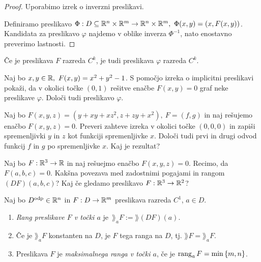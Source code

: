 \begin{proof}
    Uporabimo izrek o inverzni preslikavi. 
    
    Definiramo preslikavo $\Phi: D \subseteq \mathbb{R}^n \times \mathbb{R}^m \to  \mathbb{R}^n \times \mathbb{R}^m, \ \Phi(x,y) = (x, F(x,y))$. Kandidata za preslikavo $\varphi$ najdemo v oblike inverza $\Phi^{-1}$, nato enostavno preverimo lastnosti.
\end{proof}

\begin{posledica}
    Če je preslikava $F$ razreda $C^k$, je tudi preslikava $\varphi$ razreda $C^k$.
\end{posledica}

\begin{zgled}
    Naj bo $x,y \in \mathbb{R}, \ F(x, y) = x^2 + y^2 -1$. S pomočjo izreka o implicitni preslikavi pokaži, da v okolici točke $(0,1)$ rešitve enačbe $F(x,y) = 0$ graf neke preslikave $\varphi$. Določi tudi preslikavo $\varphi$.
\end{zgled}

\begin{zgled}
    Naj bo $F(x,y,z) = (y + xy+xz^2, z+zy+x^2), \ F = (f, g)$ in naj rešujemo enačbo $F(x,y,z) = 0$. Preveri zahteve izreka v okolici točke $(0,0,0)$ in zapiši spremenljivki $y$ in $z$ kot funkciji spremenljivke $x$. Določi tudi prvi in drugi odvod funkcij $f$ in $g$ po spremenljivke $x$. Kaj je rezultat?
\end{zgled}

\begin{zgled}
    Naj bo $F: \mathbb{R}^3 \to \mathbb{R}$ in naj rešuejmo enačbo $F(x,y,z) = 0$. Recimo, da $F(a,b,c) = 0$. Kakšna povezava med zadostnimi pogajami in rangom $(DF)(a,b,c)$? Kaj če gledamo preslikavo $F: \mathbb{R}^3 \to \mathbb{R}^2$?
\end{zgled}

\begin{definicija}
    Naj bo $D^\text{odp} \in \mathbb{R}^n$ in $F: D \to \mathbb{R}^m$ preslikava razreda $C^1$, $a \in D$. 
    \begin{enumerate}
        \item \emph{Rang preslikave $F$ v točki $a$} je~$\rang_aF := \rang (DF)(a)$.
        \item Če je $\rang_aF$ konstanten na $D$, je $F$ tega ranga na $D$, tj. $\rang F = \rang_aF$.
        \item Preslikava $F$ je \emph{maksimalnega ranga v točki $a$}, če je $\operatorname{rang}_aF = \min \left\{m, n\right\}$.
    \end{enumerate}      
\end{definicija}

